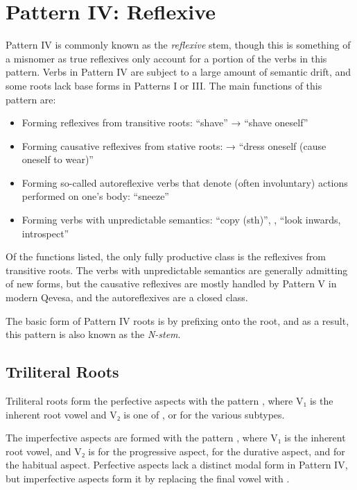 \documentclass[grammar]{subfiles}
\begin{document}
\clearpage
\section{Pattern IV: Reflexive}
\label{sec:vm_pattern_iv}

Pattern IV is commonly known as the \emph{reflexive} stem, though this is
something of a misnomer as true reflexives only account for a portion of the
verbs in this pattern.  Verbs in Pattern IV are subject to a large amount of
semantic drift, and some roots lack base forms in Patterns I or III.  The main
functions of this pattern are: 

\begin{itemize}
  \item Forming reflexives from transitive roots:  “shave” → 
    “shave oneself”
  \item Forming causative reflexives from stative roots:  →
     “dress oneself (cause oneself to wear)”
  \item Forming so-called autoreflexive verbs that denote (often involuntary)
    actions performed on one’s body:  “sneeze”
  \item Forming verbs with unpredictable semantics:  “copy (sth)”,
    ,  “look inwards, introspect”
\end{itemize}

Of the functions listed, the only fully productive class is the reflexives from
transitive roots.  The verbs with unpredictable semantics are generally
admitting of new forms, but the causative reflexives are mostly handled by
Pattern V in modern Qevesa, and the autoreflexives are a closed class.

The basic form of Pattern IV roots is by prefixing  onto the root, and as
a result, this pattern is also known as the \emph{N-stem}.


\subsection{Triliteral Roots}
\label{ssec:vm_iv_triliteral_roots}

Triliteral roots form the perfective aspects with the pattern ,
where V₁ is the inherent root vowel and V₂ is one of ,  or 
for the various subtypes.  

The imperfective aspects are formed with the pattern ,
where V₁ is the inherent root vowel, and V₂ is  for the progressive
aspect,  for the durative aspect, and  for the habitual aspect.
Perfective aspects lack a distinct modal form in Pattern IV, but imperfective
aspects form it by replacing the final vowel with . 
\end{document}
